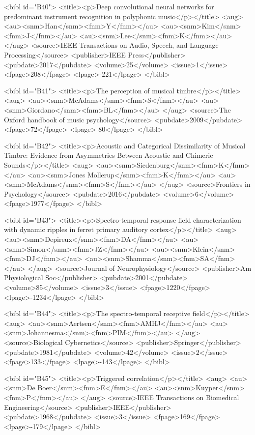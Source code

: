 \documentclass{bmcart}
\begin{document}
\begin{backmatter}
{<bibl id="B40">
  <title><p>Deep convolutional neural networks for predominant instrument
  recognition in polyphonic music</p></title>
  <aug>
    <au><snm>Han</snm><fnm>Y</fnm></au>
    <au><snm>Kim</snm><fnm>J</fnm></au>
    <au><snm>Lee</snm><fnm>K</fnm></au>
  </aug>
  <source>IEEE Transactions on Audio, Speech, and Language Processing</source>
  <publisher>IEEE Press</publisher>
  <pubdate>2017</pubdate>
  <volume>25</volume>
  <issue>1</issue>
  <fpage>208</fpage>
  <lpage>-221</lpage>
</bibl>

<bibl id="B41">
  <title><p>The perception of musical timbre</p></title>
  <aug>
    <au><snm>McAdams</snm><fnm>S</fnm></au>
    <au><snm>Giordano</snm><fnm>BL</fnm></au>
  </aug>
  <source>The {O}xford handbook of music psychology</source>
  <pubdate>2009</pubdate>
  <fpage>72</fpage>
  <lpage>-80</lpage>
</bibl>

<bibl id="B42">
  <title><p>Acoustic and Categorical Dissimilarity of Musical Timbre: Evidence
  from Asymmetries Between Acoustic and Chimeric Sounds</p></title>
  <aug>
    <au><snm>Siedenburg</snm><fnm>K</fnm></au>
    <au><snm>Jones Mollerup</snm><fnm>K</fnm></au>
    <au><snm>McAdams</snm><fnm>S</fnm></au>
  </aug>
  <source>Frontiers in Psychology</source>
  <pubdate>2016</pubdate>
  <volume>6</volume>
  <fpage>1977</fpage>
</bibl>

<bibl id="B43">
  <title><p>Spectro-temporal response field characterization with dynamic
  ripples in ferret primary auditory cortex</p></title>
  <aug>
    <au><snm>Depireux</snm><fnm>DA</fnm></au>
    <au><snm>Simon</snm><fnm>JZ</fnm></au>
    <au><snm>Klein</snm><fnm>DJ</fnm></au>
    <au><snm>Shamma</snm><fnm>SA</fnm></au>
  </aug>
  <source>Journal of Neurophysiology</source>
  <publisher>Am Physiological Soc</publisher>
  <pubdate>2001</pubdate>
  <volume>85</volume>
  <issue>3</issue>
  <fpage>1220</fpage>
  <lpage>-1234</lpage>
</bibl>

<bibl id="B44">
  <title><p>The spectro-temporal receptive field</p></title>
  <aug>
    <au><snm>Aertsen</snm><fnm>AMHJ</fnm></au>
    <au><snm>Johannesma</snm><fnm>PIM</fnm></au>
  </aug>
  <source>Biological Cybernetics</source>
  <publisher>Springer</publisher>
  <pubdate>1981</pubdate>
  <volume>42</volume>
  <issue>2</issue>
  <fpage>133</fpage>
  <lpage>-143</lpage>
</bibl>

<bibl id="B45">
  <title><p>Triggered correlation</p></title>
  <aug>
    <au><snm>De Boer</snm><fnm>E</fnm></au>
    <au><snm>Kuyper</snm><fnm>P</fnm></au>
  </aug>
  <source>IEEE Transactions on Biomedical Engineering</source>
  <publisher>IEEE</publisher>
  <pubdate>1968</pubdate>
  <issue>3</issue>
  <fpage>169</fpage>
  <lpage>-179</lpage>
</bibl>

}
\end{backmatter}
\end{document}

